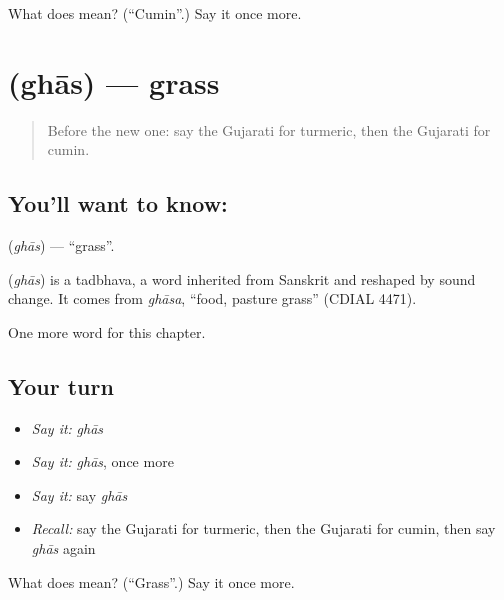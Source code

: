 \begin{tcolorbox}[breakable,colback=teal!4,colframe=teal!35!black,title={Before you move on}]
What does  mean? (\textquotedblleft{}Cumin\textquotedblright{}.) Say it once more.
\end{tcolorbox}
\section[\texorpdfstring{\gu{ઘાસ} (ghās)}{ઘાસ (ghās)}]{ (ghās) — grass}

\label{lesson:GU-C118-ghas}



\begin{quote}
Before the new one: say the Gujarati for turmeric, then the Gujarati for cumin.
\end{quote}

\subsection*{You'll want to know: }
\textbf{} (\emph{ghās}) — \textquotedblleft{}grass\textquotedblright{}.

\begin{cousinweb}
\textbf{} (\emph{ghās}) is a tadbhava, a word inherited from Sanskrit and reshaped by sound change. It comes from \emph{ghāsa}, \textquotedblleft{}food, pasture grass\textquotedblright{} (CDIAL 4471).
\end{cousinweb}

\begin{grammarlens}[title={What you've built}]
One more word for this chapter.
\end{grammarlens}

\subsection*{Your turn}
\begin{itemize}
\raggedright
  \item \emph{Say it:} \emph{ghās}
  \item \emph{Say it:} \emph{ghās}, once more
  \item \emph{Say it:} say \emph{ghās}
  \item \emph{Recall:} say the Gujarati for turmeric, then the Gujarati for cumin, then say \emph{ghās} again
\end{itemize}

\begin{tcolorbox}[breakable,colback=teal!4,colframe=teal!35!black,title={Before you move on}]
What does  mean? (\textquotedblleft{}Grass\textquotedblright{}.) Say it once more.
\end{tcolorbox}
